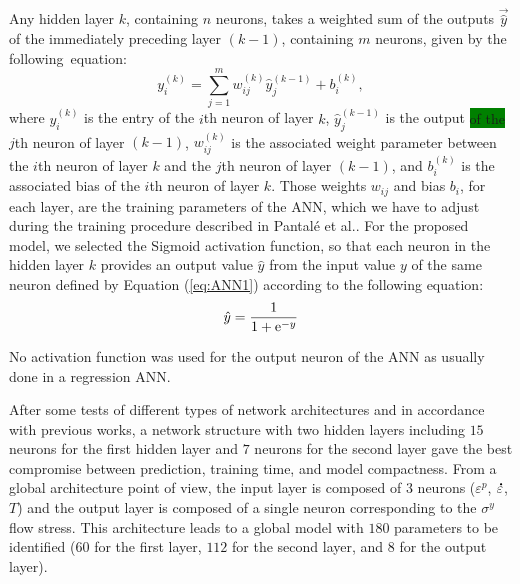 \documentclass[metals,article,accept,pdftex,moreauthors]{Definitions/mdpi}
\makeatletter
\DeclareRobustCommand{\e}[1]{{\rm e}^{#1}}
\DeclareRobustCommand{\lay}[1]{^{(#1)}}
\DeclareRobustCommand{\mdot}[1]{\accentset{\mbox{\bfseries .}}{#1}}
\DeclareRobustCommand{\eal}{et al.\@\xspace}
\newcommand{\hlok}[1]{\colorbox{green}{#1}}
\makeatother
\begin{document}
Any hidden layer $k$, containing $n$ neurons, takes a weighted sum of the outputs $\overrightarrow{\hat{y}}$ of the immediately preceding layer $(k-1)$, containing $m$ neurons, given by the following~equation:
\begin{equation}
y_i\lay{k} = \sum_{j=1}^m w_{ij}\lay{k} \hat{y}_j^{(k-1)}+ b_i\lay{k},\label{eq:ANN1}
\end{equation}
where $y_i\lay{k}$ is the entry of the  $i$th neuron of layer $k$, $\hat{y}_j\lay{k-1}$ is the output \hlok{of the} %
  $j$th neuron of layer $(k-1)$, $w_{ij}\lay{k}$ is the associated weight parameter between the  $i$th neuron of layer $k$ and the  $j$th neuron of layer $(k-1)$, and $b_i\lay{k}$ is the associated bias of the  $i$th neuron of layer $k$.
Those weights $w_{ij}$ and bias $b_i$, for each layer, are the training parameters of the ANN, which we have to adjust during the training procedure described in Pantalé \eal \cite{Pantale-2021, Pantale-2023}.
For the proposed model, we selected the Sigmoid activation function, so that each neuron in the hidden layer $k$ provides an output value ${\hat{y}}$ from the input value $y$ of the same neuron defined by Equation (\ref{eq:ANN1}) according to the following equation:
\begin{equation}
\hat{y}=\frac{1}{1 + \e{-y}}\label{eq:ANN2}
\end{equation}

No activation function was used for the output neuron of the ANN as usually done in a regression ANN.

After some tests of different types of network architectures and in accordance with previous works, a network structure with two hidden layers including $15$ neurons for the first hidden layer and $7$ neurons for the second layer gave the best compromise between prediction, training time, and model compactness.
From a global architecture point of view, the input layer is composed of $3$ neurons ($\varepsilon^p$, $\mdot\varepsilon$, $T$) and the output layer is composed of a single neuron corresponding to the $\sigma^y$ flow stress.
This architecture leads to a global model with $180$ parameters to be identified ($60$ for the first layer, $112$ for the second layer, and $8$ for the output layer).
\end{document}
